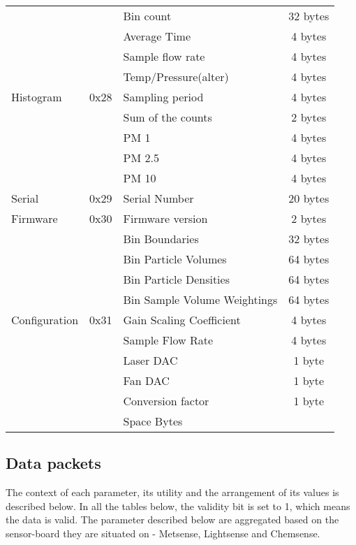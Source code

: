 \begin{center}
\begin{longtable}{|l|c|>{\centering}p{}|c|}
     \rowcolor{black!8} \multicolumn{4}{|c|}{{Alpha Sensor}} \\ \hline
        \multirow{9}{*}{Histogram} & \multirow{9}{*}{0x28} & Bin count & 32 bytes \\ \cline{3-4}
        & & Average Time & 4 bytes \\ \cline{3-4}
        & & Sample flow rate & 4 bytes \\ \cline{3-4}
        & & Temp/Pressure(alter) & 4 bytes\\ \cline{3-4}
        & & Sampling period & 4 bytes \\ \cline{3-4}
        & & Sum of the counts & 2 bytes \\ \cline{3-4}
        & & PM 1 & 4 bytes \\ \cline{3-4}
        & & PM 2.5 & 4 bytes \\ \cline{3-4}
        & & PM 10 & 4 bytes \\ \hline
        Serial & 0x29 & Serial Number & 20 bytes \\ \hline
        Firmware & 0x30 & Firmware version & 2 bytes \\ \hline
        \multirow{9}{*}{Configuration} & \multirow{9}{*}{0x31} & Bin Boundaries & 32 bytes \\ \cline{3-4}
        & & Bin Particle Volumes & 64 bytes \\ \cline{3-4}
        & & Bin Particle Densities & 64 bytes \\ \cline{3-4}
        & & Bin Sample Volume Weightings & 64 bytes \\ \cline{3-4}
        & & Gain Scaling Coefficient & 4 bytes \\ \cline{3-4}
        & & Sample Flow Rate & 4 bytes \\ \cline{3-4}
        & & Laser DAC & 1 byte \\ \cline{3-4}
        & & Fan DAC & 1 byte \\ \cline{3-4}
        & & Conversion factor & 1 byte \\ \cline{3-4}
        & & Space Bytes & \\ 

\end{longtable}
\end{center}


\newpage
\subsection{Data packets}
The context of each parameter, its utility and the arrangement of its values is described below. In all
the tables below, the validity bit is set to 1, which means the data is valid. The parameter described
below are aggregated based on the sensor-board they are situated on -
Metsense, Lightsense and Chemsense.

